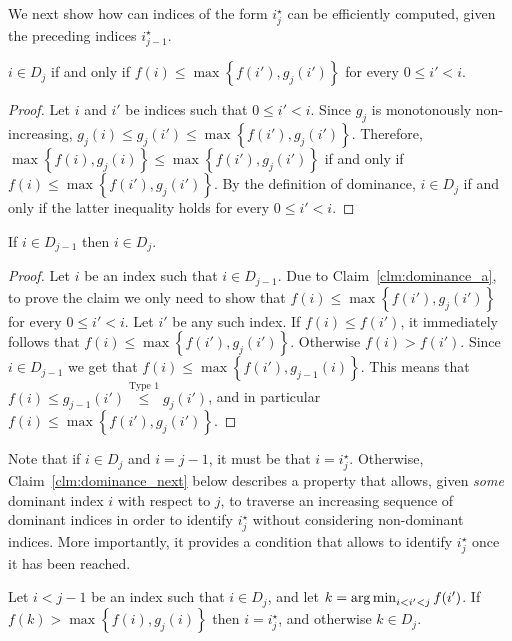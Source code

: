 We next show how can indices of the form $i^\star_j$ can be efficiently computed, given the preceding indices $i^\star_{j-1}$.

\begin{claim}
	\label{clm:dominance_a}
	$i \in D_j$ if and only if $f(i) \leq \max\left\{f(i'), g_j(i')\right\}$ for every $0 \leq i' < i$.
\end{claim}

\begin{proof}
	Let $i$ and $i'$ be indices such that $0 \leq i' < i$.
	Since $g_j$ is monotonously non-increasing, $g_j(i) \leq g_j(i') \leq \max\left\{f(i'), g_j(i')\right\}$. Therefore, $\max\left\{f(i), g_j(i)\right\} \leq \max\left\{f(i'), g_j(i')\right\}$ if and only if $f(i) \leq \max\left\{f(i'), g_j(i')\right\}$. By the definition of dominance, $i \in D_j$ if and only if the latter inequality holds for every $0 \leq i' < i$.
\end{proof}

\begin{claim}
	\label{clm:dominance_b}
	If $i \in D_{j-1}$ then $i \in D_j$.
\end{claim}

\begin{proof}
	Let $i$ be an index such that $i \in D_{j-1}$. Due to Claim~\ref{clm:dominance_a}, to prove the claim we only need to show that $f(i) \leq \max\left\{f(i'), g_j(i')\right\}$ for every $0 \leq i' < i$.
	Let $i'$ be any such index.
	If $f(i) \leq f(i')$, it immediately follows that $f(i) \leq \max\left\{f(i'), g_j(i')\right\}$.
	Otherwise  $f(i) > f(i')$. Since $i \in D_{j-1}$ we get that $f(i) \leq \max\left\{f(i'), g_{j-1}(i)\right\}$. This means that $f(i) \leq g_{j-1}(i') \stackrel{\text{Type 1}}{\leq} g_j(i')$, and in particular $f(i) \leq \max\left\{f(i'), g_j(i')\right\}$.
\end{proof}


Note that if $i \in D_j$ and $i = j-1$, it must be that $i = i^\star_j$. Otherwise, Claim~\ref{clm:dominance_next} below describes a property that allows, given \emph{some} dominant index $i$ with respect to $j$, to traverse an increasing sequence of dominant indices in order to identify $i^\star_j$ without considering non-dominant indices. More importantly, it provides a condition that allows to identify $i^\star_j$ once it has been reached.

\begin{claim}
	\label{clm:dominance_next}
	Let $i < j-1$ be an index such that $i \in D_j$, and let $k = \operatorname*{arg\,min}_{i < i' < j} f(i')$. 
	If $f(k) > \max\left\{f(i), g_j(i)\right\}$ then $i = i^\star_j$, and otherwise $k \in D_j$.
\end{claim}

